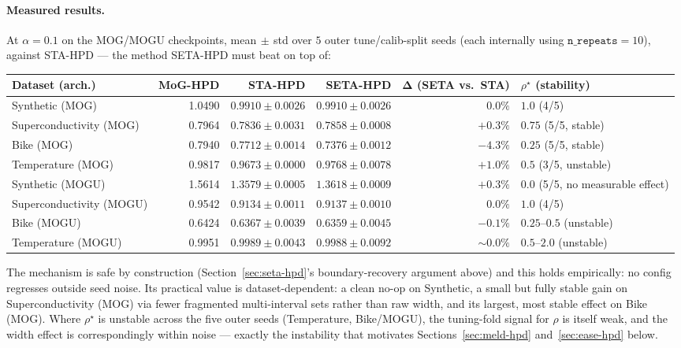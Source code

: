 \documentclass[11pt]{article}
\begin{document}
\paragraph{Measured results.} At $\alpha=0.1$ on the MOG/MOGU checkpoints, mean$\,\pm\,$std over
$5$ outer tune/calib-split seeds (each internally using $\texttt{n\_repeats}=10$), against STA-HPD
--- the method SETA-HPD must beat on top of:

\begin{center}
\begin{tabular}{@{}lrrrrl@{}}
\toprule
\textbf{Dataset (arch.)} & \textbf{MoG-HPD} & \textbf{STA-HPD} & \textbf{SETA-HPD} & $\bm\Delta$
(SETA vs.\ STA) & $\rho^\star$ (stability) \\
\midrule
Synthetic (MOG)          & 1.0490 & $0.9910\pm0.0026$ & $0.9910\pm0.0026$ & $0.0\%$ & $1.0$ (4/5) \\
Superconductivity (MOG)  & 0.7964 & $0.7836\pm0.0031$ & $\bm{0.7858\pm0.0008}$ & $+0.3\%$ & $0.75$
(5/5, stable) \\
Bike (MOG)                & 0.7940 & $0.7712\pm0.0014$ & $\bm{0.7376\pm0.0012}$ & $\bm{-4.3\%}$ &
$0.25$ (5/5, stable) \\
Temperature (MOG)         & 0.9817 & $0.9673\pm0.0000$ & $0.9768\pm0.0078$ & $+1.0\%$ & $0.5$ (3/5,
unstable) \\
Synthetic (MOGU)          & 1.5614 & $1.3579\pm0.0005$ & $1.3618\pm0.0009$ & $+0.3\%$ & $0.0$
(5/5, no measurable effect) \\
Superconductivity (MOGU) & 0.9542 & $0.9134\pm0.0011$ & $0.9137\pm0.0010$ & $0.0\%$ & $1.0$ (4/5) \\
Bike (MOGU)                & 0.6424 & $0.6367\pm0.0039$ & $0.6359\pm0.0045$ & $-0.1\%$ & $0.25$--$0.5$
(unstable) \\
Temperature (MOGU)        & 0.9951 & $0.9989\pm0.0043$ & $0.9988\pm0.0092$ & $\sim0.0\%$ &
$0.5$--$2.0$ (unstable) \\
\bottomrule
\end{tabular}
\end{center}

The mechanism is safe by construction (Section~\ref{sec:seta-hpd}'s boundary-recovery argument
above) and this holds empirically: no config regresses outside seed noise. Its practical value is
dataset-dependent: a clean no-op on Synthetic, a small but fully stable gain on Superconductivity
(MOG) via fewer fragmented multi-interval sets rather than raw width, and its largest, most stable
effect on Bike (MOG). Where $\rho^\star$ is unstable across the five outer seeds (Temperature,
Bike/MOGU), the tuning-fold signal for $\rho$ is itself weak, and the width effect is correspondingly
within noise --- exactly the instability that motivates Sections~\ref{sec:meld-hpd}
and~\ref{sec:ease-hpd} below.
\end{document}
